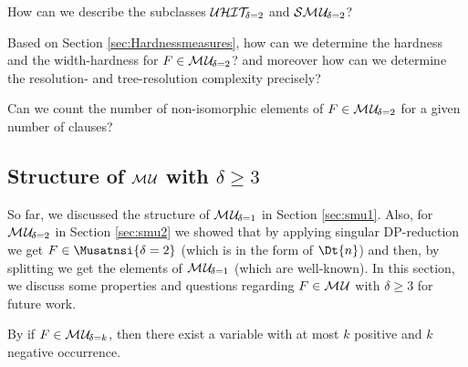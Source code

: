 \documentclass{report}
\begin{document}
\begin{quest}\label{que:mu2-uhit2}
How can we describe the subclasses $\mathcal{U}\mathcal{HIT}_{\!\!\delta=2}$ and $\mathcal{S}\mathcal{M\hspace{0.8pt}U}_{\!\delta=2}$?
\end{quest}

\begin{quest}\label{que:mu2-hardness}
Based on Section \ref{sec:Hardnessmeasures}, how can we determine the hardness and the width-hardness for $F \in \mathcal{M\hspace{0.8pt}U}_{\!\delta=2}$? and moreover how can we determine the resolution- and tree-resolution complexity precisely?
\end{quest}

\begin{quest}\label{que:mu2-count}
Can we count the number of non-isomorphic elements of $F \in \mathcal{M\hspace{0.8pt}U}_{\!\delta=2}$ for a given number of clauses?
\end{quest}

\subsection{Structure of $\mathcal{M\hspace{0.8pt}U}$ with $\delta \ge 3$}
\label{sec:smu3}

So far, we discussed the structure of $\mathcal{M\hspace{0.8pt}U}_{\!\delta=1}$ in Section \ref{sec:smu1}. Also, for $\mathcal{M\hspace{0.8pt}U}_{\!\delta=2}$ in Section \ref{sec:smu2} we showed that by applying singular DP-reduction we get $F \in \Musatnsi{\delta=2}$ (which is in the form of $\Dt{n} $) and then, by splitting we get the elements of $\mathcal{M\hspace{0.8pt}U}_{\!\delta=1}$ (which are well-known). In this section, we discuss some properties and questions regarding $F \in \mathcal{M\hspace{0.8pt}U}$ with $\delta \ge 3$ for future work.
\begin{lem}\label{lem:muk-k}
By \cite{Ku99dK} if $F \in \mathcal{M\hspace{0.8pt}U}_{\!\delta=k}$, then there exist a variable with at most $k$ positive and $k$ negative occurrence. %
\end{lem}
\end{document}

